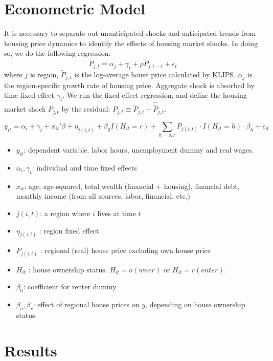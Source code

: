\documentclass[10pt]{article}
\theoremstyle{definition}
\theoremstyle{remark}
\begin{document}
\section{Econometric Model}\label{sec:model}
It is necessary to separate out unanticipated-shocks and anticipated-trends from housing price dynamics to identify the effects of housing market shocks. In doing so, we do the following regression.
\begin{equation}
    \tilde P_{j,t} = \alpha_j + \gamma_t + \rho \tilde P_{j,t-1} + \epsilon_t
\end{equation}where $j$ is region, $\tilde P_{j,t}$ is the log-average house price calculated by KLIPS. $\alpha_j$ is the region-specific growth rate of housing price. Aggregate shock is absorbed by time-fixed effect $\gamma_t$. We run the fixed effect regression, and define the housing market shock $P_{j,t}$ by the residual: $P_{j,t} \equiv \tilde P_{j,t} - \hat{\tilde P}_{j,t}$.

\begin{equation}
    y_{it} = \alpha_i + \gamma_t + x_{it}'\beta + \eta_{j(i,t)} +\beta_0 I(H_{it} = r) + \sum_{h=o,r} P_{j(i,t)}\cdot I(H_{it} = h)\cdot\beta_{h} + \epsilon_{it}
\end{equation}
\begin{itemize}
	\item $y_{it}$: dependent variable. labor hours, unemployment dummy and real wages.
	\item $\alpha_i,\gamma_t$: individual and time fixed effects
	\item $x_{it}$: age, age-squared, total wealth (financial + housing), financial debt, monthly income (from all sources. labor, financial, etc.)
	\item $j(i,t)$: a region where $i$ lives at time $t$
	\item $\eta_{j(i,t)}$ : region fixed effect
	\item $P_{j(i,t)}$ : regional (real) house price excluding own house price
	\item $H_{it}$ : house ownership status. $H_{it} = o(wner)$ or $H_{it}=r(enter)$.
	\item $\beta_0$: coefficient for renter dummy
	\item $\beta_o,\beta_r$: effect of regional house prices on $y$, depending on house ownership status.
\end{itemize}

\section{Results}\label{sec:result}
\end{document}
